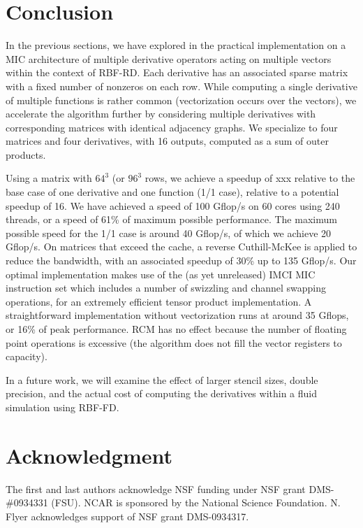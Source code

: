 \documentclass[10pt,conference,compsocconf]{IEEEtran}
\newcommand{\todo}[1]{{\color{red}\textbf{\hl{#1}}\xspace}}
\begin{document}
\section{Conclusion}
\label{sec:ccl}

In the previous sections, we have explored in the practical
implementation on a MIC architecture of multiple derivative operators
acting on multiple vectors within the context of RBF-RD. Each
derivative has an associated sparse matrix with a fixed number of
nonzeros on each row. While computing a single derivative of multiple
functions is rather common (vectorization occurs over the vectors), we
accelerate the algorithm further by considering multiple derivatives
with corresponding matrices with identical adjacency graphs. We
specialize to four matrices and four derivatives, with 16 outputs,
computed as a sum of outer products.

Using a matrix with $64^3$ (or $96^3$ rows, we achieve a speedup of
xxx relative to the base case of one derivative and one function (1/1
case), relative to a potential speedup of 16. We have achieved a
speed of 100 Gflop/s on 60 cores using 240 threads, or a speed of 61\% of
maximum possible performance. The maximum possible speed for the 1/1
case is around 40 Gflop/s, of which we achieve 20 Gflop/s. On matrices
that exceed the cache, a reverse Cuthill-McKee is applied to reduce the
bandwidth, with an associated speedup of 30\% up to 135 Gflop/s. Our
optimal implementation makes use of the (as yet unreleased) IMCI MIC instruction set 
which includes a number of swizzling and channel swapping operations, for an
extremely efficient tensor product implementation. A straightforward
implementation without vectorization runs at around 35 Gflops, or 16\% of peak
performance. RCM has no effect because the number of floating point
operations is excessive (the algorithm does not fill the vector
registers to capacity).

In a future work, we will examine the effect of larger stencil sizes,
double precision, and the actual cost of computing the derivatives
within a fluid simulation using RBF-FD.

\section*{Acknowledgment}
The first and last authors acknowledge NSF funding under NSF grant DMS-\#0934331 (FSU). 
NCAR is sponsored by the National Science Foundation. N. Flyer      
acknowledges support of NSF grant DMS-0934317.



\end{document}
